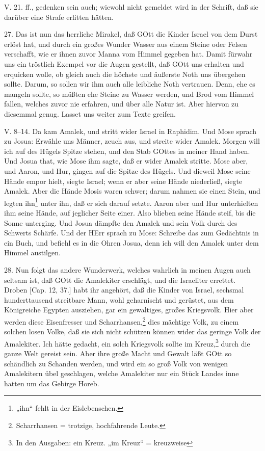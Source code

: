 \begin{schriftzitat}
V. 21. ff., gedenken sein auch; wiewohl nicht gemeldet wird in der Schrift, daß sie darüber eine Strafe erlitten hätten.
\end{schriftzitat}

27. Das ist nun das herrliche Mirakel, daß GOtt die Kinder Israel von dem Durst erlöst hat, und durch ein großes Wunder Wasser aus einem Steine oder Felsen verschafft, wie er ihnen zuvor Manna vom Himmel gegeben hat. Damit fürwahr uns ein tröstlich Exempel vor die Augen gestellt, daß GOtt uns erhalten und erquicken wolle, ob gleich auch die höchste und äußerste Noth uns übergehen sollte. Darum, so sollen wir ihm auch alle leibliche Noth vertrauen. Denn, ehe es mangeln sollte, so müßten ehe Steine zu Wasser werden, und Brod vom Himmel fallen, welches zuvor nie erfahren, und über alle Natur ist. Aber hiervon zu diesemmal genug. Lasset uns weiter zum Texte greifen.

\begin{schriftzitat}
V. 8–14. Da kam Amalek, und stritt wider Israel in Raphidim. Und Mose sprach zu Josua: Erwähle uns Männer, zeuch aus, und streite wider Amalek. Morgen will ich auf des Hügels Spitze stehen, und den Stab GOttes in meiner Hand haben. Und Josua that, wie Mose ihm sagte, daß er wider Amalek stritte. Mose aber, und Aaron, und Hur, gingen auf die Spitze des Hügels. Und dieweil Mose seine Hände empor hielt, siegte Israel; wenn er aber seine Hände niederließ, siegte Amalek. Aber die Hände Mosis waren schwer; darum nahmen sie einen Stein, und legten ihn\footnote{„ihn“ fehlt in der Eislebenschen.} unter ihn, daß er sich darauf setzte. Aaron aber und Hur unterhielten ihm seine Hände, auf jeglicher Seite einer. Also blieben seine Hände steif, bis die Sonne unterging. Und Josua dämpfte den Amalek und sein Volk durch des Schwerts Schärfe. Und der HErr sprach zu Mose: Schreibe das zum Gedächtnis in ein Buch, und befiehl es in die Ohren Josua, denn ich will den Amalek unter dem Himmel austilgen.
\end{schriftzitat}

28. Nun folgt das andere Wunderwerk, welches wahrlich in meinen Augen auch seltsam ist, daß GOtt die Amalekiter erschlägt, und die Israeliter errettet. Droben [Cap. 12, 37.] habt ihr angehört, daß die Kinder von Israel, sechsmal hunderttausend streitbare Mann, wohl geharnischt und gerüstet, aus dem Königreiche Egypten ausziehen, gar ein gewaltiges, großes
Kriegsvolk. Hier aber werden diese Eisenfresser und Scharrhansen,\footnote{Scharrhansen = trotzige, hochfahrende Leute.} dies mächtige Volk, zu einem solchen losen Volke, daß sie sich nicht schützen können wider das geringe Volk der Amalekiter. Ich hätte gedacht, ein solch Kriegsvolk sollte im Kreuz,\footnote{In den Ausgaben: ein Kreuz. „im Kreuz“ = kreuzweise} durch die ganze Welt gereist sein. Aber ihre große Macht und Gewalt läßt GOtt so schändlich zu Schanden werden, und wird ein so groß Volk von wenigen Amalekitern übel geschlagen, welche Amalekiter nur ein Stück Landes inne hatten um das Gebirge Horeb.

